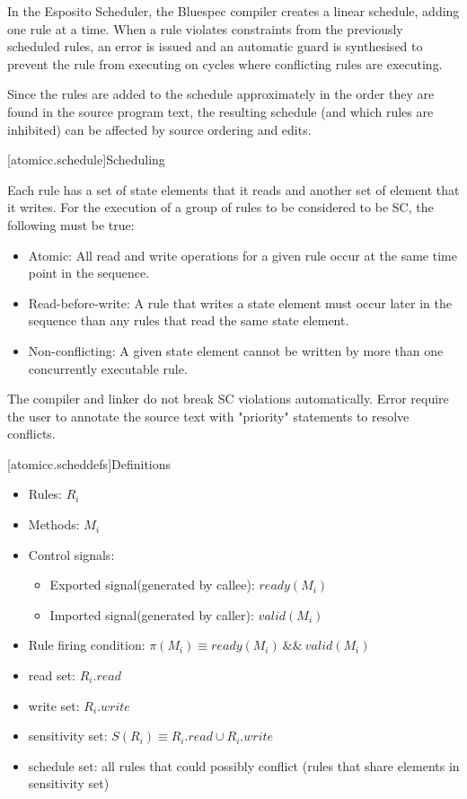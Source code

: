 In the Esposito Scheduler\cite{Esposito:Patent},
the Bluespec compiler creates a linear schedule, adding
one rule at a time.  When a rule violates constraints from the previously scheduled
rules, an error is issued and an automatic guard is synthesised to prevent the
rule from executing on cycles where conflicting rules are executing.

Since the rules are added to the schedule approximately in the order they are
found in the source program text, the resulting schedule (and which rules are
inhibited) can be affected by source ordering and edits.


[atomicc.schedule]{Scheduling}

Each rule has a set of state elements that it reads and another set of element that it writes.
For the execution of a group of rules to be considered to be SC, the following must
be true:

\begin{itemize}
\item Atomic: All read and write operations for a given rule occur at the same time point in the sequence.
\item Read-before-write:  A rule that writes a state element must occur later in the sequence
than any rules that read the same state element.
\item Non-conflicting: A given state element cannot be written by more than one concurrently executable rule.
\end{itemize}

The compiler and linker do not break SC violations automatically. Error require the user to annotate
the source text with "priority" statements to resolve conflicts.

[atomicc.scheddefs]{Definitions}
\begin{itemize}
\item Rules: $R_{i}$
\item Methods: $M_{i}$
\item Control signals:
\begin {itemize}
\item Exported signal(generated by callee):  $ready(M_{i})$
\item Imported signal(generated by caller):  $valid(M_{i})$
\end{itemize}
\item Rule firing condition: $\pi(M_{i}) \equiv ready(M_{i})\ \&\&\ valid(M_{i})$
\item read set: $R_{i}.read$
\item write set: $R_{i}.write$
\item sensitivity set: $S(R_{i}) \equiv R_{i}.read \cup R_{i}.write$
\item schedule set: all rules that could possibly conflict (rules that share elements in sensitivity set)
\end{itemize}

